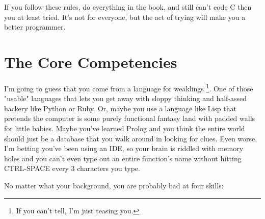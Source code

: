 If you follow these rules, do everything in the book, and still can't
code C then you at least tried.  It's not for everyone, but the act
of trying will make you a better programmer.

\section*{The Core Competencies}

I'm going to guess that you come from a language for weaklings \footnote{If you
can't tell, I'm just teasing you.}.  One of those "usable" languages that lets
you get away with sloppy thinking and half-assed hackery like Python or Ruby.
Or, maybe you use a language like Lisp that pretends the computer is some
purely functional fantasy land with padded walls for little babies.  Maybe
you've learned Prolog and you think the entire world should just be a database
that you walk around in looking for clues.  Even worse, I'm betting you've been
using an IDE, so your brain is riddled with memory holes and you can't even
type out an entire function's name without hitting CTRL-SPACE every 3
characters you type.

No matter what your background, you are probably bad at four skills:

